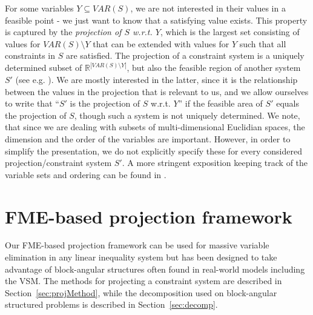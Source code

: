 \documentclass{llncs}
\newcommand{\VAR}{\mathit{VAR}}
\begin{document}
For some variables $Y\subseteq \VAR(S)$, we are not interested in their values in a feasible point - we just want to know that a satisfying value exists. This property is captured by the \emph{projection of $S$ w.r.t. $Y$}, which is the largest set consisting of values for $\VAR(S)\setminus Y$ that can be extended with values for $Y$ such that all constraints in $S$ are satisfied. 
%
The projection of a constraint system is a uniquely determined subset of $\mathbb{R}^{|\VAR(S)\setminus Y|}$, but also the feasible region of another system $S'$ (see e.g. \cite{ziegler95}). We are mostly interested in the latter, since it is the relationship between the values in the projection that is relevant to us, and we allow ourselves to write that ``$S'$ is the projection of $S$ w.r.t. $Y$'' if the feasible area of $S'$ equals the projection of $S$, though such a system is not uniquely determined.
We note, that since we are dealing with subsets of multi-dimensional Euclidian spaces, the dimension and the order of the variables are important. However, in order to simplify the presentation, we do not explicitly specify these for every considered projection/constraint system $S'$. A more stringent exposition keeping track of the variable sets and ordering can be found in \cite{mytechrep}.


\section{FME-based projection framework} \label{sec:method}
Our FME-based projection framework can be used for massive variable elimination in any linear inequality system but has been designed to take advantage of block-angular structures often found in real-world models including the VSM. The methods for projecting a constraint system are described in Section~\ref{sec:projMethod}, while the decomposition used on block-angular structured problems is  described in Section~\ref{sec:decomp}.
\end{document}
